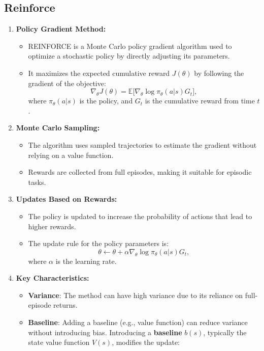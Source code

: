 \documentclass[12pt,a4paper]{article}
\begin{document}
\subsection{Reinforce}%
\begin{enumerate}
    \item \textbf{Policy Gradient Method:}
    \begin{itemize}
        \item REINFORCE is a Monte Carlo policy gradient algorithm used to optimize a stochastic policy by directly adjusting its parameters.
        \item It maximizes the expected cumulative reward \( J(\theta) \) by following the gradient of the objective:
        \[
        \nabla_\theta J(\theta) = \mathbb{E} \big[ \nabla_\theta \log \pi_\theta(a | s) G_t \big],
        \]
        where \( \pi_\theta(a | s) \) is the policy, and \( G_t \) is the cumulative reward from time \( t \).

    \end{itemize}

    \item \textbf{Monte Carlo Sampling:}
    \begin{itemize}
        \item The algorithm uses sampled trajectories to estimate the gradient without relying on a value function.
        \item Rewards are collected from full episodes, making it suitable for episodic tasks.
    \end{itemize}

    \item \textbf{Updates Based on Rewards:}
    \begin{itemize}
        \item The policy is updated to increase the probability of actions that lead to higher rewards.
        \item The update rule for the policy parameters is:
        \[
        \theta \gets \theta + \alpha \nabla_\theta \log \pi_\theta(a | s) G_t,
        \]
        where \( \alpha \) is the learning rate.
    \end{itemize}

    \item \textbf{Key Characteristics:}
    \begin{itemize}
        \item \textbf{Variance}: The method can have high variance due to its reliance on full-episode returns.
        \item \textbf{Baseline}: Adding a baseline (e.g., value function) can reduce variance without introducing bias. Introducing a \textbf{baseline} \( b(s) \), typically the state value function \( V(s) \), modifies the update:


\end{itemize}
\end{enumerate}
\end{document}
